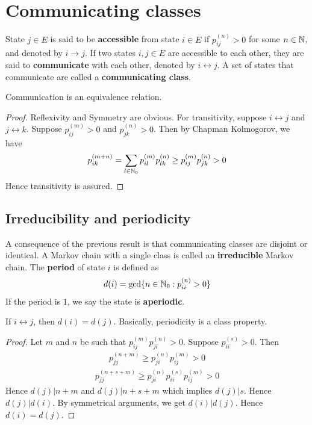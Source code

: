 \documentclass[a4paper,10pt,english]{article}
\begin{document}
\section{Communicating classes}
State $j \in E$ is said to be \textbf{accessible} from state $i \in E$ if $p_{ij}^{(n)} >0$ for some $n \in \mathbb{N}$, and denoted by $i \to j$. 
If two states $i,j \in E$ are accessible to each other, they are said to \textbf{communicate} with each other, denoted by $i \leftrightarrow j$. 
A set of states that communicate are called a \textbf{communicating class}. 

\begin{prop}
Communication is an equivalence relation. 
\end{prop}
\begin{proof}
Reflexivity and Symmetry are obvious. For transitivity, suppose $i \leftrightarrow j$ and $j \leftrightarrow k$. Suppose $p_{ij}^{(m)} >0$ and $p_{jk}^{(n)} >0$. Then by Chapman Kolmogorov, we have
\begin{align*}p_{ik}^{(m+n)} = \sum_{l \in \mathbb{N}_0} p_{il}^{(m)}p_{lk}^{(n)} \geq p_{ij}^{(m)}p_{jk}^{(n)} >0  \end{align*}
Hence transitivity is assured.
\end{proof}

\subsection{Irreducibility and periodicity}
A consequence of the previous result is that communicating classes are disjoint or identical. 
A Markov chain with a single class is called an \textbf{irreducible} Markov chain.
The \textbf{period} of state $i$ is defined as
\begin{align*}d(i) = \gcd\{n \in \mathbb{N}_0 : p_{ii}^{(n)} > 0\}\end{align*}
If the period is $1$, we say the state is \textbf{aperiodic}.

\begin{prop}
If $i \leftrightarrow j$, then $d(i) = d(j)$. Basically, periodicity is a class property.
\end{prop}
\begin{proof}
Let $m$ and $n$ be such that $p_{ij}^{(m)}p_{ji}^{(n)} > 0$. Suppose $p_{ii}^{(s)} > 0$. Then
\begin{align*} p_{jj}^{(n+m)} \geq p_{ji}^{(n)}p_{ij}^{(m)} > 0 \end{align*}
\begin{align*} p_{jj}^{(n+s+m)} \geq p_{ji}^{(n)}p_{ii}^{(s)}p_{ij}^{(m)} > 0 \end{align*}
Hence $d(j) | n+m$ and $d(j) | n+s+m$ which implies $d(j) | s$. Hence $d(j) | d(i)$. By symmetrical arguments, we get $d(i) | d(j)$. Hence $d(i) = d(j)$.
\end{proof}
\end{document}
